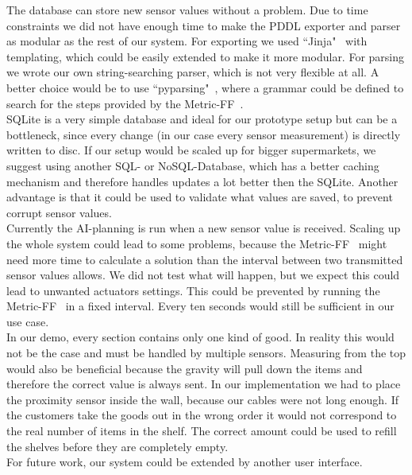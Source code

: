 \documentclass[runningheads]{llncs}
\begin{document}
	The database can store new sensor values without a problem. 
	Due to time constraints we did not have enough time to make the PDDL exporter and parser as modular as the rest of our system. 
	For exporting we used ``Jinja"~\cite{jinja} with templating, which could be easily extended to make it more modular.
	For parsing we wrote our own string-searching parser, which is not very flexible at all. 
	A better choice would be to use ``pyparsing"~\cite{pyparsing}, where a grammar could be defined to search for the steps provided by the Metric-FF~\cite{ff}. 
	\\ \linebreak
	SQLite is a very simple database and ideal for our prototype setup but can be a bottleneck, since every change (in our case every sensor measurement) is directly written to disc. 
	If our setup would be scaled up for bigger supermarkets, we suggest using another SQL- or NoSQL-Database, which has a better caching mechanism and therefore handles updates a lot better then the SQLite. 
	Another advantage is that it could be used to validate what values are saved, to prevent corrupt sensor values.
	\\ \linebreak
	Currently the AI-planning is run when a new sensor value is received. 
	Scaling up the whole system could lead to some problems, because the Metric-FF~\cite{ff} might need more time to calculate a solution than the interval between two transmitted sensor values allows. 
	We did not test what will happen, but we expect this could lead to unwanted actuators settings. 
	This could be prevented by running the Metric-FF~\cite{ff} in a fixed interval. 
	Every ten seconds would still be sufficient in our use case.
	\\ \linebreak
	In our demo, every section contains only one kind of good. 
	In reality this would not be the case and must be handled by multiple sensors. 
	Measuring from the top would also be beneficial because the gravity will pull down the items and therefore the correct value is always sent. 
	In our implementation we had to place the proximity sensor inside the wall, because our cables were not long enough. 
	If the customers take the goods out in the wrong order it would not correspond to the real number of items in the shelf. 
	The correct amount could be used to refill the shelves before they are completely empty.
	\\ \linebreak
	For future work, our system could be extended by another user interface. 
\end{document}
